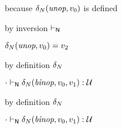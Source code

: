 {\begin{lamportproof*}
    \begin{pfproof}
        \begin{pfproof}
          because $\delta_{N}(\textit{unop}, v_0)$ is defined
        \end{pfproof}
        \begin{pfproof}
          by inversion $\vdash_{\mathsf{N}}$
        \end{pfproof}
      \qedstep
        \begin{pfproof}
          $\delta_{N}(\textit{unop}, v_0) = v_2$
        \end{pfproof}
    \end{pfproof}

    \begin{pfproof}
        \begin{pfproof}
          by definition $\delta_{N}$
        \end{pfproof}
      \qedstep
        \begin{pfproof}
          ${\cdot} \vdash_{\mathsf{N}} \delta_{N}(\textit{binop}, v_0, v_1) : {\mathcal U}$
        \end{pfproof}
    \end{pfproof}

    \begin{pfproof}
        \begin{pfproof}
          by definition $\delta_{N}$
        \end{pfproof}
      \qedstep
        \begin{pfproof}
          ${\cdot} \vdash_{\mathsf{N}} \delta_{N}(\textit{binop}, v_0, v_1) : {\mathcal U}$
        \end{pfproof}
    \end{pfproof}

\end{lamportproof*}}

